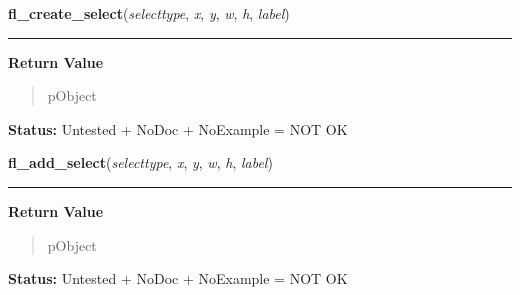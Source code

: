     \label{xformslib:library:fl_create_select}

    \vspace{0.5ex}

\hspace{.8\funcindent}\begin{boxedminipage}{\funcwidth}

    \raggedright \textbf{fl\_create\_select}(\textit{selecttype}, \textit{x}, \textit{y}, \textit{w}, \textit{h}, \textit{label})

    \vspace{-1.5ex}

    \rule{\textwidth}{0.5\fboxrule}
\setlength{\parskip}{2ex}
\setlength{\parskip}{1ex}
      \textbf{Return Value}
    \vspace{-1ex}

      \begin{quote}
      pObject

      \end{quote}

\textbf{Status:} Untested + NoDoc + NoExample = NOT OK



    \end{boxedminipage}

    \label{xformslib:library:fl_add_select}

    \vspace{0.5ex}

\hspace{.8\funcindent}\begin{boxedminipage}{\funcwidth}

    \raggedright \textbf{fl\_add\_select}(\textit{selecttype}, \textit{x}, \textit{y}, \textit{w}, \textit{h}, \textit{label})

    \vspace{-1.5ex}

    \rule{\textwidth}{0.5\fboxrule}
\setlength{\parskip}{2ex}
\setlength{\parskip}{1ex}
      \textbf{Return Value}
    \vspace{-1ex}

      \begin{quote}
      pObject

      \end{quote}

\textbf{Status:} Untested + NoDoc + NoExample = NOT OK



    \end{boxedminipage}

